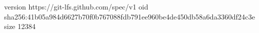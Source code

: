 version https://git-lfs.github.com/spec/v1
oid sha256:41b05a984d6627b70f0b767088fdb791ee960be4de450db58a6da3360df24c3e
size 12384
